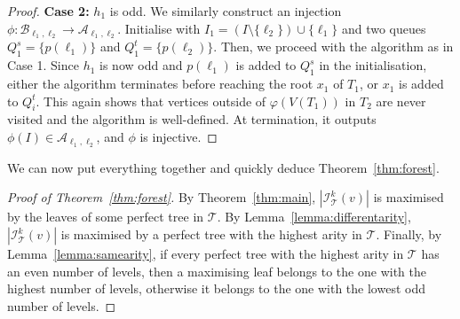 \documentclass[11pt]{article}
\theoremstyle{definition}
\newcommand{\cI}{\mathcal{I}}
\begin{document}
\begin{proof}
\textbf{Case 2:} $h_1$ is odd. We similarly construct an injection $\phi:\mathcal{B}_{\ell_1,\ell_2} \to \mathcal{A}_{\ell_1,\ell_2}$. Initialise with $I_1 = (I \setminus \{\ell_2\}) \cup \{\ell_1\}$ and two queues $Q_1^s=\{p(\ell_1)\}$ and $Q_1^t=\{p(\ell_2)\}$. Then, we proceed with the algorithm as in Case 1. Since $h_1$ is now odd and $p(\ell_1)$ is added to $Q_1^s$ in the initialisation, either the algorithm terminates before reaching the root $x_1$ of $T_1$, or $x_1$ is added to $Q_i^t$. This again shows that vertices outside of $\varphi(V(T_1))$ in $T_2$ are never visited and the algorithm is well-defined. At termination, it outputs $\phi(I)\in\mathcal{A}_{\ell_1,\ell_2}$, and $\phi$ is injective. 
\end{proof}

We can now put everything together and quickly deduce Theorem~\ref{thm:forest}.
\begin{proof}[Proof of Theorem~\ref{thm:forest}]
By Theorem~\ref{thm:main}, $|\cI_{\mathcal{T}}^k(v)|$ is maximised by the leaves of some perfect tree in $\mathcal{T}$. By Lemma~\ref{lemma:differentarity}, $|\cI_{\mathcal{T}}^k(v)|$ is maximised by a perfect tree with the highest arity in $\mathcal{T}$. Finally, by Lemma~\ref{lemma:samearity}, if every perfect tree with the highest arity in $\mathcal{T}$ has an even number of levels, then a maximising leaf belongs to the one with the highest number of levels, otherwise it belongs to the one with the lowest odd number of levels.
\end{proof}



\end{document}
